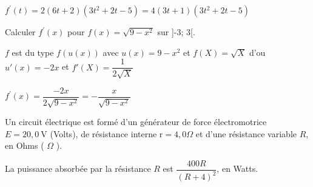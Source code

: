 \documentclass[11pt,a4paper]{article}  %
\begin{document}
\begin{enumMet}
\begin{corrBox}
		$f^{\prime}(t)=2(6t+2)(3t^2+2t-5)=4(3t+1)(3t^2+2t-5)$
	\end{corrBox}
	\item Calculer $f^{\prime}(x)$ pour $f(x)=\sqrt{9-x^2}$ sur ]-3; 3[.
	\begin{corrBox}
		$f$ est du type $f(u(x))$ avec $u(x)=9-x^2$ et $f(X)=\sqrt{X}$ d'ou $u'(x)=-2x$ et $f'(X)=\dfrac{1}{2\sqrt{X}}$

		$f^{\prime}(x)=\dfrac{-2x}{2\sqrt{9-x^2}}=-\dfrac{x}{\sqrt{9-x^2}}$
	\end{corrBox}
\end{enumMet}

\vspace*{-0.5cm}

Un circuit électrique est formé d'un générateur de force électromotrice $E=20,0 \mathrm{~V}$ (Volts), de résistance interne $\mathrm{r}=4,0 \Omega$ et d'une résistance variable $R$, en Ohms ( $\Omega$ ).

La puissance absorbée par la résistance $R$ est $\dfrac{400 R}{(R+4)^2}$, en Watts.
\end{document}
